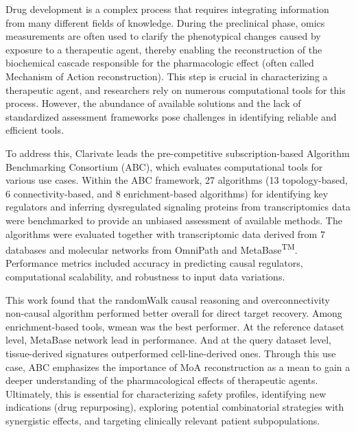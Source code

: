 ﻿%

%

Drug development is a complex process that requires integrating information from many different fields of knowledge.
During the preclinical phase, omics measurements are often used to clarify the phenotypical changes caused by exposure to a therapeutic agent, thereby enabling the reconstruction of the biochemical cascade responsible for the pharmacologic effect (often called Mechanism of Action reconstruction).
This step is crucial in characterizing a therapeutic agent, and researchers rely on numerous computational tools for this process.
However, the abundance of available solutions and the lack of standardized assessment frameworks pose challenges in identifying reliable and efficient tools.

To address this, Clarivate leads the pre-competitive subscription-based Algorithm Benchmarking Consortium (ABC), which evaluates computational tools for various use cases.
Within the ABC framework, 27 algorithms (13 topology-based, 6 connectivity-based, and 8 enrichment-based algorithms) for identifying key regulators and inferring dysregulated signaling proteins from transcriptomics data were benchmarked to provide an unbiased assessment of available methods.
The algorithms were evaluated together with transcriptomic data derived from 7 databases and molecular networks from OmniPath and  MetaBase\textsuperscript{TM}.
Performance metrics included accuracy in predicting causal regulators, computational scalability, and robustness to input data variations.

This work found that the randomWalk causal reasoning and overconnectivity non-causal algorithm performed better overall for direct target recovery. Among enrichment-based tools, wmean was the best performer.
At the reference dataset level, MetaBase network lead in performance. And at the query dataset level, tissue-derived signatures outperformed cell-line-derived ones.
Through this use case, ABC emphasizes the importance of MoA reconstruction as a mean to gain a deeper understanding of the pharmacological effects of therapeutic agents. Ultimately, this is essential for characterizing safety profiles, identifying new indications (drug repurposing), exploring potential combinatorial strategies with synergistic effects, and targeting clinically relevant patient subpopulations.

